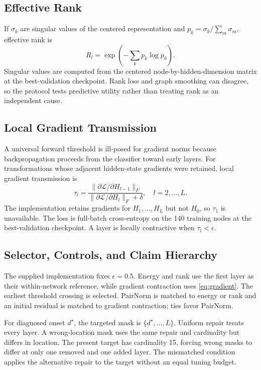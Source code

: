 \documentclass[journal]{IEEEtran}
\begin{document}
\subsection{Effective Rank}

If $\sigma_k$ are singular values of the centered representation and $p_k=\sigma_k/\sum_m\sigma_m$, effective rank is
\begin{equation}
R_l=\exp\left(-\sum_k p_k\log p_k\right).
\label{eq:rank}
\end{equation}
Singular values are computed from the centered node-by-hidden-dimension matrix at the best-validation checkpoint. Rank loss and graph smoothing can disagree, so the protocol tests predictive utility rather than treating rank as an independent cause.

\subsection{Local Gradient Transmission}

A universal forward threshold is ill-posed for gradient norms because backpropagation proceeds from the classifier toward early layers. For transformations whose adjacent hidden-state gradients were retained, local gradient transmission is
\begin{equation}
\tau_l=\frac{\|\partial\mathcal{L}/\partial H_{l-1}\|_F}{\|\partial\mathcal{L}/\partial H_l\|_F+\delta},\quad l=2,\ldots,L.
\label{eq:gradient}
\end{equation}
The implementation retains gradients for $H_1,\ldots,H_L$ but not $H_0$, so $\tau_1$ is unavailable. The loss is full-batch cross-entropy on the 140 training nodes at the best-validation checkpoint. A layer is locally contractive when $\tau_l<\epsilon$.

\subsection{Selector, Controls, and Claim Hierarchy}

The supplied implementation fixes $\epsilon=0.5$. Energy and rank use the first layer as their within-network reference, while gradient contraction uses \eqref{eq:gradient}. The earliest threshold crossing is selected. PairNorm is matched to energy or rank and an initial residual is matched to gradient contraction; ties favor PairNorm.

For diagnosed onset $d^\star$, the targeted mask is $\{d^\star,\ldots,L\}$. Uniform repair treats every layer. A wrong-location mask uses the same repair and cardinality but differs in location. The present target has cardinality 15, forcing wrong masks to differ at only one removed and one added layer. The mismatched condition applies the alternative repair to the target without an equal tuning budget.
\end{document}
